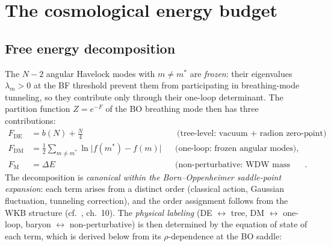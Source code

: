 \section{The cosmological energy budget}
\label{sec:cosmology}

\subsection{Free energy decomposition}
The $N - 2$ angular Havelock modes with $m \ne m^*$
are \emph{frozen}: their eigenvalues $\lambda_m > 0$ at
the BF threshold prevent them from participating in
breathing-mode tunneling, so they contribute only through
their one-loop determinant.
The partition function $Z = e^{-F}$ of the BO
breathing mode then has three contributions:
\begin{align}
  F_{\mathrm{DE}} &= b(N) + \tfrac{N}{4}
    & &\text{(tree-level: vacuum $+$ radion zero-point)}, \label{eq:F-DE}\\
  F_{\mathrm{DM}} &= \tfrac{1}{2}\!\sum_{m \ne m^*}\!
    \ln\bigl|f(m^*) - f(m)\bigr|
    & &\text{(one-loop: frozen angular modes)}, \label{eq:F-DM}\\
  F_{\mathrm{M}}  &= \Delta E
    & &\text{(non-perturbative: WDW mass gap)}. \label{eq:F-M}
\end{align}
The decomposition is \emph{canonical within the Born--Oppenheimer
saddle-point expansion}: each term arises from a distinct order
(classical action, Gaussian fluctuation, tunneling correction),
and the order assignment follows from the WKB structure
(cf.\ \citealt{BenderOrszag1978}, ch.~10).
The \emph{physical labeling}
(DE $\leftrightarrow$ tree, DM $\leftrightarrow$ one-loop,
baryon $\leftrightarrow$ non-perturbative)
is then determined by the equation of state of each term,
which is derived below from its $\rho$-dependence at the
BO saddle:
